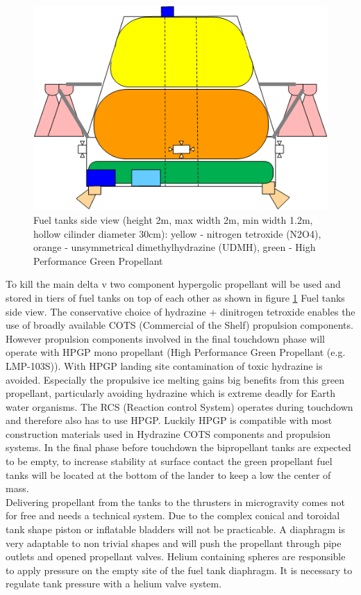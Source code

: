 \begin{figure}[htb]
	\centering
	\includegraphics[width=\textwidth]{Lander/aaronfueltank}
	\caption{Fuel tanks side view (height 2m, max width 2m, min width 1.2m, hollow cilinder diameter 30cm): yellow - nitrogen tetroxide (N2O4), orange - unsymmetrical dimethylhydrazine (UDMH), green - High Performance Green Propellant \label{fig:afuelTank}}
\end{figure}

\noindent
To kill the main delta v two component hypergolic propellant will be used and stored in tiers of fuel tanks on top of each other as shown in figure \ref{fig:afuelTank} Fuel tanks side view. The conservative choice of hydrazine + dinitrogen tetroxide enables the  use of broadly available COTS (Commercial of the Shelf) propulsion components. However propulsion components involved in the final touchdown phase will operate with HPGP mono propellant (High Performance Green Propellant (e.g. LMP-103S)). With HPGP landing site contamination of toxic hydrazine is avoided. Especially the propulsive ice melting gains big benefits from this green propellant, particularly avoiding hydrazine which is extreme deadly for Earth water organisms. The RCS (Reaction control System) operates during touchdown and therefore also has to use HPGP. Luckily HPGP is compatible with most construction materials used in Hydrazine COTS components and propulsion systems. In the final phase before touchdown the bipropellant tanks are expected to be empty, to increase stability at surface contact the green propellant fuel tanks will be located at the bottom of the lander to keep a low the center of mass.\\
Delivering propellant from the tanks to the thrusters in microgravity comes not for free and needs a technical system. Due to the complex conical and toroidal tank shape piston or inflatable bladders will not be practicable. A diaphragm is very adaptable to non trivial shapes and will push the propellant through pipe outlets and opened propellant valves. Helium containing spheres  are responsible to apply pressure on the empty site of the fuel tank diaphragm. It is necessary to regulate tank pressure with a helium valve system.\\

